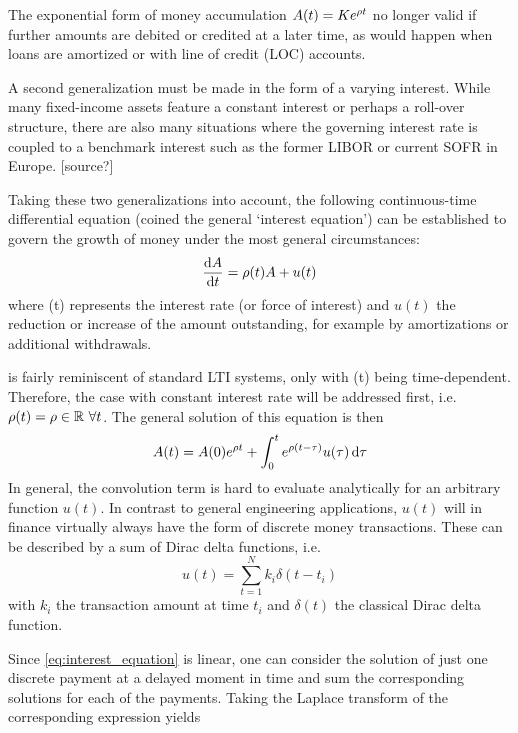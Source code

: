 The exponential form of money accumulation $A(t) = K e^{\rho t}$ no longer valid if further amounts are debited or credited at a later time, as would happen when loans are amortized or with line of credit (LOC) accounts. 

A second generalization must be made in the form of a varying interest. While many fixed-income assets feature a constant interest or perhaps a roll-over structure, there are also many situations where the governing interest rate is coupled to a benchmark interest such as the former LIBOR or current SOFR in Europe. [source?]

Taking these two generalizations into account, the following continuous-time differential equation (coined the general `interest equation') can be established to govern the growth of money under the most general circumstances:
\begin{equation}
    \dv{\ensuremath{A}}{t} = \rho(t) A + u(t)
    \label{eq:interest_equation}
\end{equation}
where \hanv(t) represents the interest rate (or force of interest) and $u(t)$ the reduction or increase of the amount outstanding, for example by amortizations or additional withdrawals. 

 is fairly reminiscent of standard LTI systems, only with \hanv(t) being time-dependent. Therefore, the case with constant interest rate will be addressed first, i.e. $\rho(t) = \rho \in \mathbb{R} \ \forall t$. The general solution of this equation is then
\begin{equation}
    A(t) = A(0)e^{\rho t} + \int_0^t e^{\rho (t - \tau)} u(\tau )\dd{\tau}
\end{equation}
In general, the convolution term is hard to evaluate analytically for an arbitrary function $u(t)$. In contrast to general engineering applications, $u(t)$ will in finance virtually always have the form of discrete money transactions. These can be described by a sum of Dirac delta functions, i.e. 
\begin{equation}
    u(t) = \sum^N_{t=1} k_i \delta(t - t_i)
\end{equation}
with $k_i$ the transaction amount at time $t_i$ and $\delta(t)$ the classical Dirac delta function.

Since \cref{eq:interest_equation} is linear, one can consider the solution of just one discrete payment at a delayed moment in time and sum the corresponding solutions for each of the payments. Taking the Laplace transform of the corresponding expression yields

